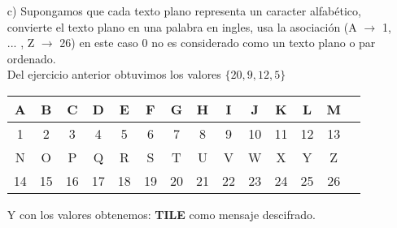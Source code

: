 \documentclass[10pt,a4paper]{article}
\begin{document}
\begin{enumerate}
\begin{itemize}
\begin{itemize}
\end{itemize}
\item[c)] Supongamos que cada texto plano representa un caracter alfabético, convierte el texto plano en una palabra en ingles, usa la asociación (A $\rightarrow$ 1, ... , Z $\rightarrow$ 26) en este caso 0 no es considerado como un texto plano o par ordenado.\\
Del ejercicio anterior obtuvimos los valores $\lbrace 20, 9,12,5 \rbrace$\\
\begin{center}
\begin{tabular}{|c|c|c|c|c|c|c|c|c|c|c|c|c|c|}
\hline
A & B & C & D & E & F & G & H & I & J & K & L & M \\
\hline
1 & 2 & 3 & 4 & 5 & 6 & 7 & 8 & 9 & 10 & 11 & 12 & 13\\
\hline 
N & O & P & Q & R & S & T & U & V & W & X & Y & Z \\
\hline
14 & 15 & 16 & 17 & 18 & 19 & 20 & 21 & 22 & 23 & 24 & 25 & 26\\
\hline 
\end{tabular}
\end{center}
\begin{center}
Y con los valores obtenemos: \textbf{TILE} como mensaje descifrado.
\end{center}
\end{itemize}
\end{enumerate}
\end{document}

